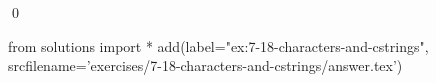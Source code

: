 
\begin{ex}
  \label{ex:7-18-characters-and-cstrings}
  
  \qed
\end{ex}
\begin{python0}
from solutions import *
add(label="ex:7-18-characters-and-cstrings",
    srcfilename='exercises/7-18-characters-and-cstrings/answer.tex')
\end{python0}
